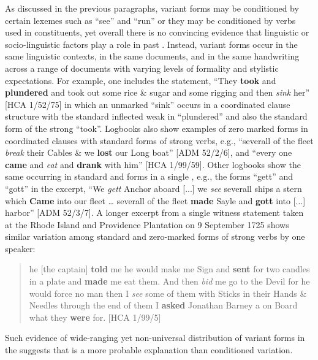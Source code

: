 As discussed in the previous paragraphs,  variant forms may be conditioned by certain lexemes such as “see” and “run” or they may be conditioned by verbs used in  constituents, yet overall there is no convincing evidence that linguistic or socio-linguistic factors play a role in past . Instead, variant forms occur in the same linguistic contexts, in the same documents, and in the same handwriting across a range of documents with varying levels of formality and stylistic expectations. For example, one  includes the statement, “They \textbf{took} and \textbf{plundered} and took out some rice \& sugar and some rigging and then \textit{sink} her” [HCA 1/52/75] in which an unmarked  “sink” occurs in a coordinated clause structure with the standard inflected weak  in  “plundered” and also the standard form of the strong   “took”. Logbooks also show examples of zero marked  forms in coordinated clauses with standard forms of strong verbs, e.g., “severall of the fleet \textit{break} their Cables \& we \textbf{lost} our Long boat” [ADM 52/2/6], and “every one \textbf{came} and \textit{eat} and \textbf{drank} with him” [HCA 1/99/59]. Other logbooks show the same  occurring in standard and  forms in a single , e.g., the  forms “gett” and “gott” in the excerpt, “We \textit{gett} Anchor aboard [...] we \textit{see} severall ships a stern which \textbf{Came} into our fleet … severall of the fleet \textbf{made} Sayle and \textbf{gott} into [...] harbor” [ADM 52/3/7]. A longer excerpt from a single witness statement taken at the Rhode Island and Providence Plantation on 9 September {1725} shows similar variation among standard and zero-marked forms of strong verbs by one speaker:

\begin{quotation}
he [the captain] \textbf{told} me he would make me Sign and \textbf{sent} for two candles in a plate and \textbf{made} me eat them. And then \textit{bid} me go to the Devil for he would force no man then I \textit{see} some of them with Sticks in their Hands \& Needles through the end of them I \textbf{asked} Jonathan Barney a  on Board what they \textbf{were} for. [HCA 1/99/5]
\end{quotation}

Such evidence of wide-ranging yet non-universal distribution of variant forms in the  suggests that  is a more probable explanation than conditioned variation.

